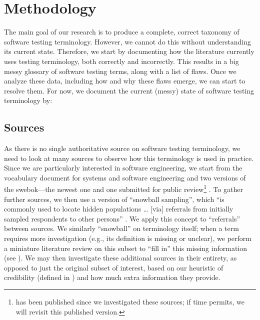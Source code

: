\section{Methodology}\label{methodology}

The main goal of our research is to produce a complete, correct taxonomy of
software testing terminology. However, we cannot do this without understanding
its current state. Therefore, we start by documenting how the literature
currently uses testing terminology, both correctly and incorrectly. This
results in a big messy glossary of software testing terms, along with a list of
flaws. Once we analyze these data, including how and why these flaws emerge, we
can start to resolve them. For now, we document the current (messy) state of
software testing terminology by:



\subsection{Sources}\label{sources}
As there is no single authoritative source on software testing terminology,
we need to look at many sources to observe how this terminology is used in
practice. Since we are particularly interested in software engineering, we
start from the vocabulary document for systems and software engineering%
\citep{IEEE2017} and two versions of the \acf{swebok}---the newest
one \citep{SWEBOK2014} and one submitted for public review\footnote{
     \citep{SWEBOK2024} has been published since we investigated
    these sources; if time permits, we will revisit this published version.
} \citep{SWEBOK2024}. To gather further sources, we then use a version of
``snowball sampling'',
which ``is commonly used to locate hidden populations \dots{} [via] referrals
from initially sampled respondents to other persons'' \citep{Johnson2014}. We
apply this concept to ``referrals'' between sources. \addTextEx{} We similarly
``snowball'' on terminology itself; when a term requires more investigation
(e.g., its definition is missing or unclear), we perform a
miniature literature review on this subset to ``fill in'' this missing
information (see ). We may then investigate these additional
sources in their entirety, as opposed to just the original subset of interest,
based on our heuristic of credibility (defined in ) and how much
extra information they provide.

